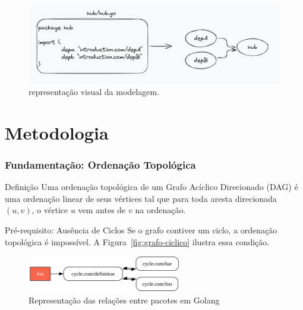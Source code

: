 \documentclass{beamer}
\begin{document}
\begin{frame}
    \begin{figure}
        \includegraphics[width=1\textwidth]{images/model.png}
        \caption{representação visual da modelagem.}
        \label{fig:modelagem}
    \end{figure}
\end{frame}

\section{Metodologia}
\begin{frame}
  \frametitle{Fundamentação: Ordenação Topológica}
  
    \begin{block}{Definição}
        Uma ordenação topológica de um Grafo Acíclico Direcionado (DAG) é uma ordenação linear de seus vértices tal que para toda aresta direcionada $(u, v)$, o vértice $u$ vem antes de $v$ na ordenação.
    \end{block}

    \begin{alertblock}{Pré-requisito: Ausência de Ciclos}
        Se o grafo contiver um ciclo, a ordenação topológica é impossível. A Figura~\ref{fig:grafo-ciclico} ilustra essa condição.
    \end{alertblock}
    
    \begin{figure}
        \includegraphics[width=0.6\textwidth]{images/cycle.png}
        \caption{Representação das relações entre pacotes em Golang}
        \label{fig:golang-overview}
    \end{figure}
\end{frame}
\end{document}

